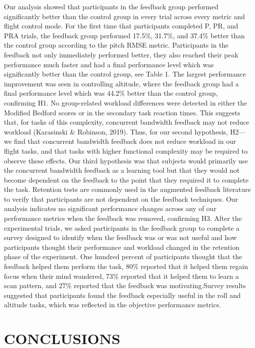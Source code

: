 Our analysis showed that participants in the feedback group performed significantly better than the control group in every trial across every metric and flight control mode.
For the first time that participants completed P, PR, and PRA trials, the feedback group performed 17.5\%, 31.7\%, and 37.4\% better than the control group according to the pitch RMSE metric.
Participants in the feedback not only immediately performed better, they also reached their peak performance much faster and had a final performance level which was significantly better than the control group, see Table 1.
The largest performance improvement was seen in controlling altitude, where the feedback group had a final performance level which was 44.2\% better than the control group, confirming H1.
No group-related workload differences were detected in either the Modified Bedford scores or in the secondary task reaction times.
This suggests that, for tasks of this complexity, concurrent bandwidth feedback may not reduce workload (Karasinski \& Robinson, 2019).
Thus, for our second hypothesis, H2—we find that concurrent bandwidth feedback does not reduce workload in our flight tasks, and that tasks with higher functional complexity may be required to observe these effects.
Our third hypothesis was that subjects would primarily use the concurrent bandwidth feedback as a learning tool but that they would not become dependent on the feedback to the point that they required it to complete the task.
Retention tests are commonly used in the augmented feedback literature to verify that participants are not dependent on the feedback techniques.
Our analysis indicates no significant performance changes across any of our performance metrics when the feedback was removed, confirming H3.
After the experimental trials, we asked participants in the feedback group to complete a survey designed to identify when the feedback was or was not useful and how participants thought their performance and workload changed in the retention phase of the experiment.
One hundred percent of participants thought that the feedback helped them perform the task, 80\% reported that it helped them regain focus when their mind wandered, 73\% reported that it helped them to learn a scan pattern, and 27\% reported that the feedback was motivating.Survey results suggested that participants found the feedback especially useful in the roll and altitude tasks, which was reflected in the objective performance metrics.

\section{CONCLUSIONS}

